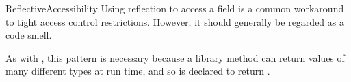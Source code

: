 \begin{pattern}{ReflectiveAccessibility}
\issues{}
Using reflection to access a field is a common workaround to tight access control restrictions.
However, it should generally be regarded as a code smell.

As with , this pattern is necessary because
a library method can return values of many different types at run time,
and so is declared to return .

\end{pattern}

